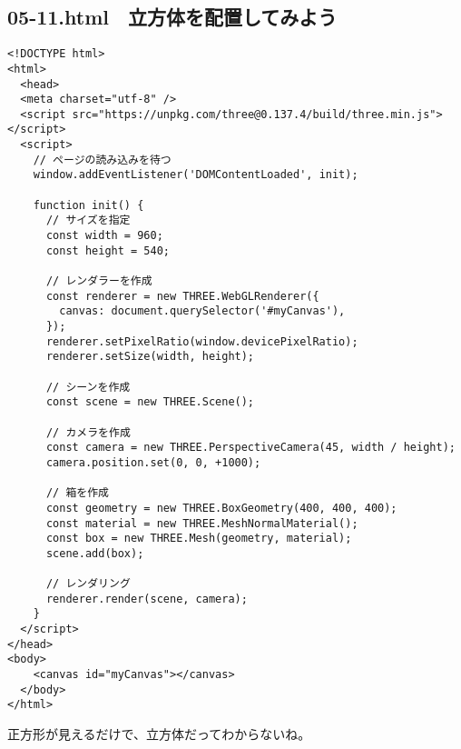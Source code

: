\documentclass[mingoth,11pt,a4j,uplatex]{jsarticle}
\begin{document}
\subsection{05-11.html　立方体を配置してみよう}
\begin{lstlisting}[caption=05-11.html]
<!DOCTYPE html>
<html>
  <head>
  <meta charset="utf-8" />
  <script src="https://unpkg.com/three@0.137.4/build/three.min.js"></script>
  <script>
    // ページの読み込みを待つ
    window.addEventListener('DOMContentLoaded', init);

    function init() {
      // サイズを指定
      const width = 960;
      const height = 540;

      // レンダラーを作成
      const renderer = new THREE.WebGLRenderer({
        canvas: document.querySelector('#myCanvas'),
      });
      renderer.setPixelRatio(window.devicePixelRatio);
      renderer.setSize(width, height);

      // シーンを作成
      const scene = new THREE.Scene();

      // カメラを作成
      const camera = new THREE.PerspectiveCamera(45, width / height);
      camera.position.set(0, 0, +1000);

      // 箱を作成
      const geometry = new THREE.BoxGeometry(400, 400, 400);
      const material = new THREE.MeshNormalMaterial();
      const box = new THREE.Mesh(geometry, material);
      scene.add(box);

      // レンダリング
      renderer.render(scene, camera); 
    }
  </script>
</head>
<body>
    <canvas id="myCanvas"></canvas>
  </body>
</html>
\end{lstlisting}

正方形が見えるだけで、立方体だってわからないね。
\end{document}
